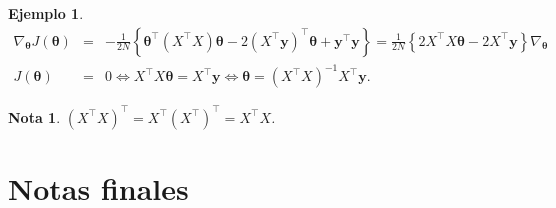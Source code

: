 \documentclass[12pt]{article}
\newtheorem{Note}{Nota}%
\newtheorem{Ejem}{Ejemplo}%
\begin{document}
\begin{Ejem}
\begin{eqnarray*}
\nabla_{\boldsymbol{\theta}} J(\boldsymbol{\theta})&=& -\frac{1}{2N} \left\{ \boldsymbol{\theta}^{\top} (X^{\top}X)\boldsymbol{\theta} - 2(X^{\top} \mathbf{y})^{\top} \boldsymbol{\theta} + \mathbf{y}^{\top} \mathbf{y} \right\}= \frac{1}{2N} \left\{ 2 X^{\top} X \boldsymbol{\theta} - 2 X^{\top} \mathbf{y} \right\}
\nabla_{\boldsymbol{\theta}}\\
 J(\boldsymbol{\theta})&=& 0 \Leftrightarrow X^{\top} X \boldsymbol{\theta} = X^{\top} \mathbf{y} \Leftrightarrow \boldsymbol{\theta}= (X^{\top} X)^{-1} X^{\top} \mathbf{y}.
\end{eqnarray*}
\end{Ejem}

\begin{Note}
$(X^{\top} X)^{\top}=X^{\top}(X^{\top})^{\top}=X^{\top} X$.
\end{Note}


\section{Notas finales}
\end{document}
